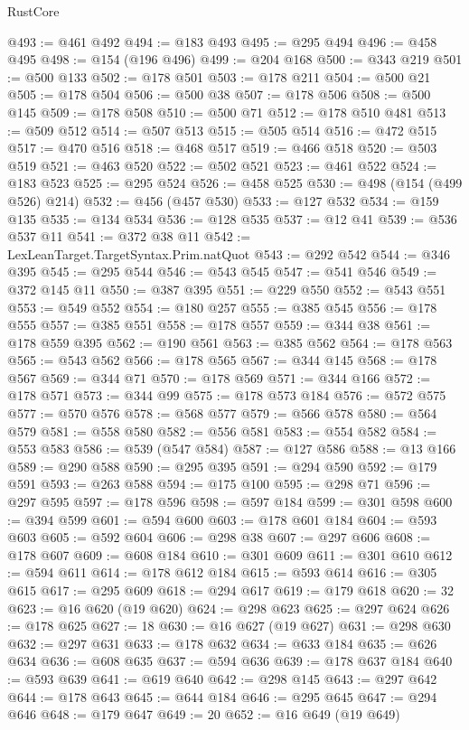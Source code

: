 \begin{lexlean}{RustCore}
\begin{coremodule}
@493 := @461 @492
@494 := @183 @493
@495 := @295 @494
@496 := @458 @495
@498 := @154 (@196 @496)
@499 := @204 @168
@500 := @343 @219
@501 := @500 @133
@502 := @178 @501
@503 := @178 @211
@504 := @500 @21
@505 := @178 @504
@506 := @500 @38
@507 := @178 @506
@508 := @500 @145
@509 := @178 @508
@510 := @500 @71
@512 := @178 @510 @481
@513 := @509 @512
@514 := @507 @513
@515 := @505 @514
@516 := @472 @515
@517 := @470 @516
@518 := @468 @517
@519 := @466 @518
@520 := @503 @519
@521 := @463 @520
@522 := @502 @521
@523 := @461 @522
@524 := @183 @523
@525 := @295 @524
@526 := @458 @525
@530 := @498 (@154 (@499 @526) @214)
@532 := @456 (@457 @530)
@533 := @127 @532
@534 := @159 @135
@535 := @134 @534
@536 := @128 @535
@537 := @12 @41
@539 := @536 @537 @11
@541 := @372 @38 @11
@542 := LexLeanTarget.TargetSyntax.Prim.natQuot
@543 := @292 @542
@544 := @346 @395
@545 := @295 @544
@546 := @543 @545
@547 := @541 @546
@549 := @372 @145 @11
@550 := @387 @395
@551 := @229 @550
@552 := @543 @551
@553 := @549 @552
@554 := @180 @257
@555 := @385 @545
@556 := @178 @555
@557 := @385 @551
@558 := @178 @557
@559 := @344 @38
@561 := @178 @559 @395
@562 := @190 @561
@563 := @385 @562
@564 := @178 @563
@565 := @543 @562
@566 := @178 @565
@567 := @344 @145
@568 := @178 @567
@569 := @344 @71
@570 := @178 @569
@571 := @344 @166
@572 := @178 @571
@573 := @344 @99
@575 := @178 @573 @184
@576 := @572 @575
@577 := @570 @576
@578 := @568 @577
@579 := @566 @578
@580 := @564 @579
@581 := @558 @580
@582 := @556 @581
@583 := @554 @582
@584 := @553 @583
@586 := @539 (@547 @584)
@587 := @127 @586
@588 := @13 @166
@589 := @290 @588
@590 := @295 @395
@591 := @294 @590
@592 := @179 @591
@593 := @263 @588
@594 := @175 @100
@595 := @298 @71
@596 := @297 @595
@597 := @178 @596
@598 := @597 @184
@599 := @301 @598
@600 := @394 @599
@601 := @594 @600
@603 := @178 @601 @184
@604 := @593 @603
@605 := @592 @604
@606 := @298 @38
@607 := @297 @606
@608 := @178 @607
@609 := @608 @184
@610 := @301 @609
@611 := @301 @610
@612 := @594 @611
@614 := @178 @612 @184
@615 := @593 @614
@616 := @305 @615
@617 := @295 @609
@618 := @294 @617
@619 := @179 @618
@620 := 32
@623 := @16 @620 (@19 @620)
@624 := @298 @623
@625 := @297 @624
@626 := @178 @625
@627 := 18
@630 := @16 @627 (@19 @627)
@631 := @298 @630
@632 := @297 @631
@633 := @178 @632
@634 := @633 @184
@635 := @626 @634
@636 := @608 @635
@637 := @594 @636
@639 := @178 @637 @184
@640 := @593 @639
@641 := @619 @640
@642 := @298 @145
@643 := @297 @642
@644 := @178 @643
@645 := @644 @184
@646 := @295 @645
@647 := @294 @646
@648 := @179 @647
@649 := 20
@652 := @16 @649 (@19 @649)

\end{coremodule}
\end{lexlean}
